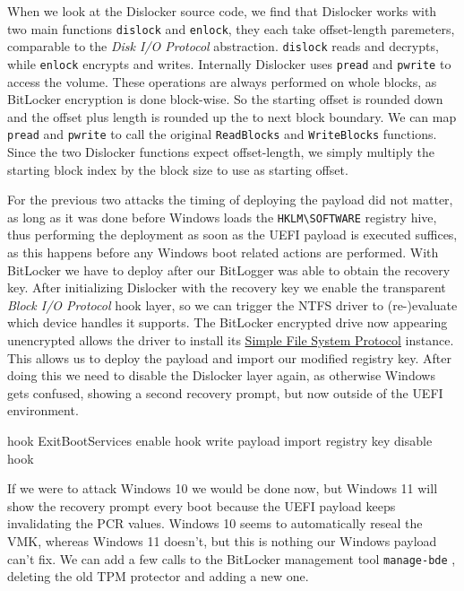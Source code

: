When we look at the Dislocker source code, we find that Dislocker works with two main functions \lstinline{dislock} and \lstinline{enlock}, they each take offset-length paremeters, comparable to the \emph{Disk \ac{I/O} Protocol} abstraction.
\lstinline{dislock} reads and decrypts, while \lstinline{enlock} encrypts and writes.
Internally Dislocker uses \lstinline{pread} and \lstinline{pwrite} to access the volume.
These operations are always performed on whole blocks, as BitLocker encryption is done block-wise.
So the starting offset is rounded down and the offset plus length is rounded up the to next block boundary.
We can map \lstinline{pread} and \lstinline{pwrite} to call the original \lstinline{ReadBlocks} and \lstinline{WriteBlocks} functions.
Since the two Dislocker functions expect offset-length, we simply multiply the starting block index by the block size to use as starting offset.


For the previous two attacks the timing of deploying the payload did not matter, as long as it was done before Windows loads the \lstinline{HKLM\SOFTWARE} registry hive, thus performing the deployment as soon as the \ac{UEFI} payload is executed suffices, as this happens before any Windows boot related actions are performed.
With BitLocker we have to deploy after our BitLogger was able to obtain the recovery key.
After initializing Dislocker with the recovery key we enable the transparent \emph{Block \ac{I/O} Protocol} hook layer, so we can trigger the \ac{NTFS} driver to (re-)evaluate which device handles it supports.
The BitLocker encrypted drive now appearing unencrypted allows the driver to install its \hyperref[lst:simple-filesytem-protocol]{Simple File System Protocol} instance.
This allows us to deploy the payload and import our modified registry key.
After doing this we need to disable the Dislocker layer again, as otherwise Windows gets confused, showing a second recovery prompt, but now outside of the \ac{UEFI} environment.

\cite{exitbootservices-hooking}
hook ExitBootServices
enable hook
write payload
import registry key
disable hook

If we were to attack Windows 10 we would be done now, but Windows 11 will show the recovery prompt every boot because the \ac{UEFI} payload keeps invalidating the \ac{PCR} values. Windows 10 seems to automatically reseal the \ac{VMK}, whereas Windows 11 doesn't, but this is nothing our Windows payload can't fix. We can add a few calls to the BitLocker management tool \lstinline{manage-bde} \cite{microsoft-bitlocker-manage-bde}, deleting the old \ac{TPM} protector and adding a new one.

